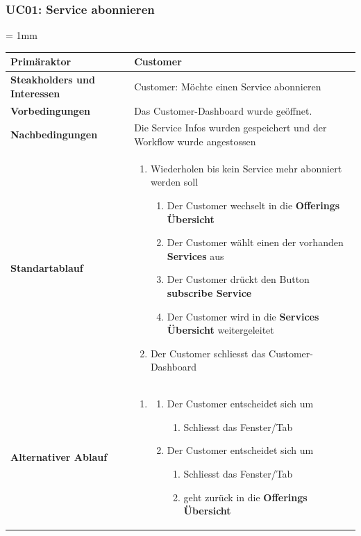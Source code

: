 \documentclass[11pt]{scrartcl}
\begin{document}
\subsubsection{UC01: Service abonnieren}
\belowtabulinesep = 1mm
\begin{longtabu} to \textwidth {X[1,l] X[2,l]}
	\bfseries Primäraktor & Customer  \\\hline 
	\bfseries Steakholders und Interessen & Customer: Möchte einen Service abonnieren  \\\hline 
	\bfseries Vorbedingungen & Das Customer-Dashboard wurde geöffnet. \\\hline 
	\bfseries Nachbedingungen & Die Service Infos wurden gespeichert und der Workflow wurde angestossen  
	\\\hline 
	\bfseries Standartablauf & 
		\begin{enumerate}
			\item Wiederholen bis kein Service mehr abonniert werden soll
			\begin{enumerate}
			    \item Der Customer wechselt in die \textbf{Offerings Übersicht}
			    \item Der Customer wählt einen der vorhanden \textbf{Services} aus
			    \item Der Customer drückt den Button \textbf{subscribe Service}
			    \item Der Customer wird in die \textbf{Services Übersicht} weitergeleitet
			\end{enumerate}
		\item Der Customer schliesst das Customer-Dashboard
		\end{enumerate}
      \\\hline
      	\bfseries Alternativer Ablauf & 
		\begin{enumerate}
		  
		  
		  \item 
                 \begin{enumerate}
		    \item Der Customer entscheidet sich um
		    \begin{enumerate}
		      \item Schliesst das Fenster/Tab
		    \end{enumerate}
		    \item  Der Customer entscheidet sich um
		     \begin{enumerate}
		      \item Schliesst das Fenster/Tab
		      \item geht zurück in die \textbf{Offerings Übersicht}
		    \end{enumerate}
		    

\end{enumerate}
\end{enumerate}
\end{longtabu}
\end{document}
